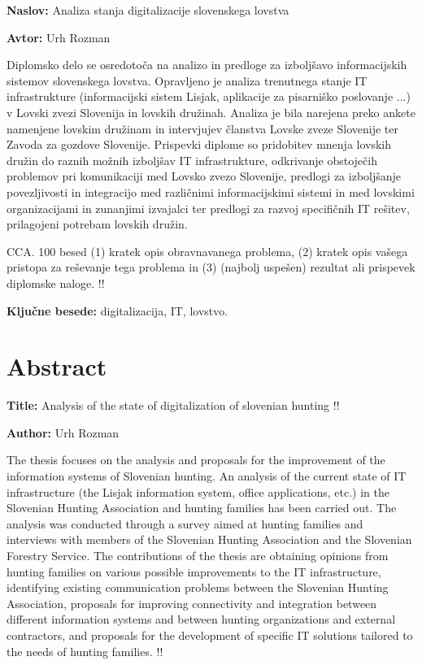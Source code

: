 \documentclass[a4paper,12pt,openright]{book}
\newcommand{\ttitle}{Analiza stanja digitalizacije slovenskega lovstva}
\newcommand{\ttitleEn}{Analysis of the state of digitalization of slovenian hunting !!}
\newcommand{\tauthor}{Urh Rozman}
\newcommand{\tkeywords}{digitalizacija, IT, lovstvo}
\newcommand{\clearemptydoublepage}{\newpage{\pagestyle{empty}\cleardoublepage}}
\begin{document}
\noindent\textbf{Naslov:} \ttitle
\bigskip

\noindent\textbf{Avtor:} \tauthor
\bigskip

\noindent 

Diplomsko delo se osredotoča na analizo in predloge za izboljšavo informacijskih sistemov slovenskega lovstva.
Opravljeno je analiza trenutnega stanje IT infrastrukture (informacijski sistem Lisjak, aplikacije za pisarniško poslovanje ...) v Lovski zvezi Slovenija in lovskih družinah.
Analiza je bila narejena preko ankete namenjene lovskim družinam in intervjujev članstva Lovske zveze Slovenije ter Zavoda za gozdove Slovenije.
Prispevki diplome so pridobitev mnenja lovskih družin do raznih možnih izboljšav IT infrastrukture, odkrivanje obstoječih problemov pri komunikaciji med Lovsko zvezo Slovenije, predlogi za izboljšanje povezljivosti in integracijo med različnimi informacijskimi sistemi in med lovskimi organizacijami in zunanjimi izvajalci ter predlogi za razvoj specifičnih IT rešitev, prilagojeni potrebam lovskih družin.  

CCA. 100 besed
 (1) kratek opis obravnavanega problema, (2) kratek opis vašega pristopa za reševanje tega problema in (3) (najbolj uspešen) rezultat ali prispevek diplomske naloge. !!

\bigskip

\noindent\textbf{Ključne besede:} \tkeywords.
\clearemptydoublepage

\chapter*{Abstract}

\noindent\textbf{Title:} \ttitleEn
\bigskip

\noindent\textbf{Author:} \tauthor
\bigskip

\noindent
The thesis focuses on the analysis and proposals for the improvement of the information systems of Slovenian hunting. An analysis of the current state of IT infrastructure (the Lisjak information system, office applications, etc.) in the Slovenian Hunting Association and hunting families has been carried out. The analysis was conducted through a survey aimed at hunting families and interviews with members of the Slovenian Hunting Association and the Slovenian Forestry Service. The contributions of the thesis are obtaining opinions from hunting families on various possible improvements to the IT infrastructure, identifying existing communication problems between the Slovenian Hunting Association, proposals for improving connectivity and integration between different information systems and between hunting organizations and external contractors, and proposals for the development of specific IT solutions tailored to the needs of hunting families.  !!
\bigskip
\end{document}

